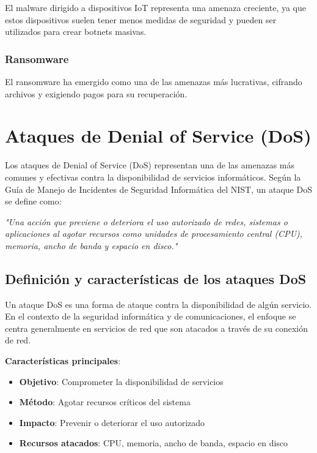 El malware dirigido a dispositivos IoT representa una amenaza creciente, ya que estos dispositivos suelen tener menos medidas de seguridad y pueden ser utilizados para crear botnets masivas.

\subsubsection{Ransomware}

El ransomware ha emergido como una de las amenazas más lucrativas, cifrando archivos y exigiendo pagos para su recuperación.

\section{Ataques de Denial of Service (DoS)}

Los ataques de Denial of Service (DoS) representan una de las amenazas más comunes y efectivas contra la disponibilidad de servicios informáticos. Según la Guía de Manejo de Incidentes de Seguridad Informática del NIST, un ataque DoS se define como:

\textit{"Una acción que previene o deteriora el uso autorizado de redes, sistemas o aplicaciones al agotar recursos como unidades de procesamiento central (CPU), memoria, ancho de banda y espacio en disco."}

\subsection{Definición y características de los ataques DoS}

Un ataque DoS es una forma de ataque contra la disponibilidad de algún servicio. En el contexto de la seguridad informática y de comunicaciones, el enfoque se centra generalmente en servicios de red que son atacados a través de su conexión de red.

\textbf{Características principales}:
\begin{itemize}
    \item \textbf{Objetivo}: Comprometer la disponibilidad de servicios
    \item \textbf{Método}: Agotar recursos críticos del sistema
    \item \textbf{Impacto}: Prevenir o deteriorar el uso autorizado
    \item \textbf{Recursos atacados}: CPU, memoria, ancho de banda, espacio en disco
\end{itemize}

